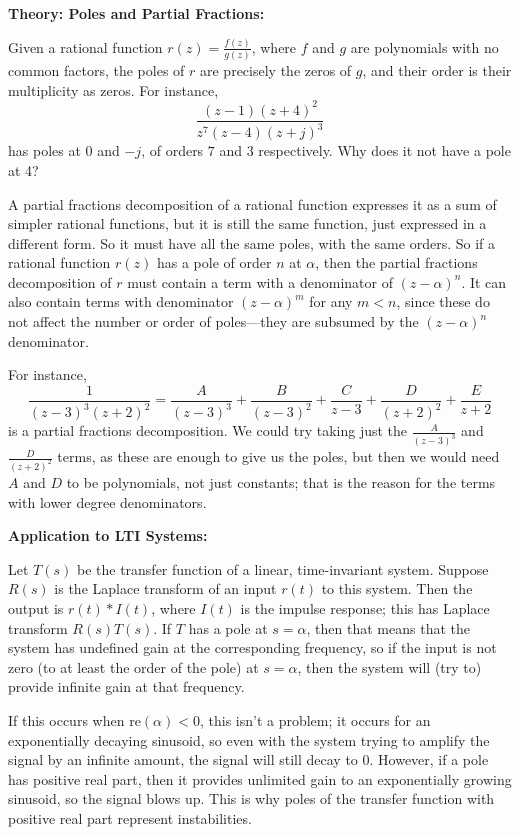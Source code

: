 \documentclass{article}
\begin{document}
\textbf{Theory: Poles and Partial Fractions:}\bigskip


Given a rational function $r(z)=\frac{f(z)}{g(z)}$, where $f$ and $g$ are polynomials with no common factors, the poles of $r$ are precisely the zeros of $g$, and their order is their multiplicity as zeros. For instance,
\[\frac{(z-1)(z+4)^2}{z^7(z-4)(z+j)^3}\]
has poles at $0$ and $-j$, of orders $7$ and $3$ respectively. Why does it not have a pole at 4?\medskip


A partial fractions decomposition of a rational function expresses it as a sum of simpler rational functions, but it is still the same function, just expressed in a different form. So it must have all the same poles, with the same orders. So if a rational function $r(z)$ has a pole of order $n$ at $\alpha$, then the partial fractions decomposition of $r$ must contain a term with a denominator of $(z-\alpha)^n$. It can also contain terms with denominator $(z-\alpha)^m$ for any $m<n$, since these do not affect the number or order of poles---they are subsumed by the $(z-\alpha)^n$ denominator.

For instance,
\[\frac{1}{(z-3)^3(z+2)^2}=\frac{A}{(z-3)^3}+\frac{B}{(z-3)^2}+\frac{C}{z-3}+\frac{D}{(z+2)^2}+\frac{E}{z+2}\]
is a partial fractions decomposition. We could try taking just the $\frac{A}{(z-3)^3}$ and $\frac{D}{(z+2)^2}$ terms, as these are enough to give us the poles, but then we would need $A$ and $D$ to be polynomials, not just constants; that is the reason for the terms with lower degree denominators.\bigskip


\textbf{Application to LTI Systems:}\bigskip


Let $T(s)$ be the transfer function of a linear, time-invariant system. Suppose $R(s)$ is the Laplace transform of an input $r(t)$ to this system. Then the output is $r(t)\ast I(t)$, where $I(t)$ is the impulse response; this has Laplace transform $R(s)T(s)$. If $T$ has a pole at $s=\alpha$, then that means that the system has undefined gain at the corresponding frequency, so if the input is not zero (to at least the order of the pole) at $s=\alpha$, then the system will (try to) provide infinite gain at that frequency.

If this occurs when $\mathrm{re}(\alpha)<0$, this isn't a problem; it occurs for an exponentially decaying sinusoid, so even with the system trying to amplify the signal by an infinite amount, the signal will still decay to 0. However, if a pole has positive real part, then it provides unlimited gain to an exponentially growing sinusoid, so the signal blows up. This is why poles of the transfer function with positive real part represent instabilities.
\end{document}
